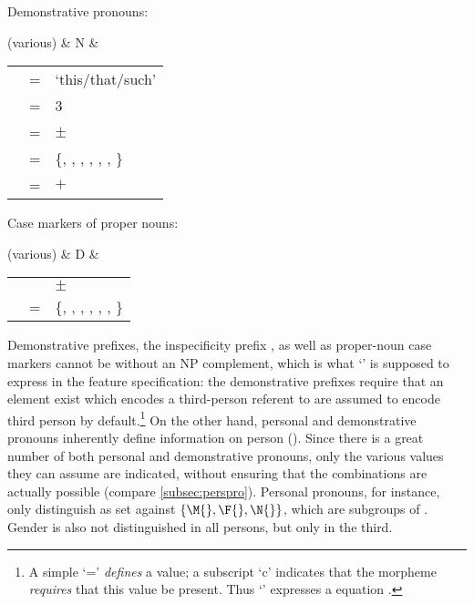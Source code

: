 \a Demonstrative pronouns:\medskip

	\begin{tabu} {}
	(various)
		& N
		& \begin{tabular}[t]{l l l}
			\ups{\Pred} & = & `this/that/such' \\
			\ups{\Pers} & = & 3 \\
			\ups{\Anim} & = & $\pm$ \\
			\ups{\Case} & = & \{\Aarg{}, \Parg{}, \Dat{}, \Gen{}, 
				\Loc{}, \Ins{}, \Caus{}\} \\
			\ups{\Spec} & = & $+$ \\
		\end{tabular}
	\end{tabu}
	
\a\label{ex:dlexsem-propn}Case markers of proper nouns:\medskip	
	
	\begin{tabu} {}
	(various)
		& D
		& \begin{tabular}[t]{l l l}
			\ups{\Anim} & \req{} & $\pm$ \\
			\ups{\Case} & = & \{\Aarg{}, \Parg{}, \Dat{}, \Gen{}, 
				\Loc{}, \Ins{}, \Caus{}\} \\
		\end{tabular}
	\end{tabu}\medskip
	
\xe

Demonstrative prefixes, the inspecificity prefix , as well as 
proper-noun case markers cannot be without an NP complement, which is what 
`\req{}' is supposed to express in the feature specification: the demonstrative 
prefixes require that an element exist which encodes a third-person referent to 
are assumed to encode third person by default.\footnote{A simple `=' 
\emph{defines} a value; a subscript `c' indicates that the morpheme 
\emph{requires} that this value be present. Thus `\req{}' expresses a 
 equation \citep[59--61]{bresnan2016}.} On the other hand, 
personal and demonstrative pronouns inherently define information on person 
(\Pers{}). Since there is a great number of both personal and demonstrative 
pronouns, only the various values they can assume are indicated, without 
ensuring that the combinations are actually possible (compare 
\autoref{subsec:perspro}). Personal pronouns, for instance, only distinguish 
\Inan{} as set against $\{\M{}, \F{}, \N{}\}$, which are subgroups of \An{}. 
Gender is also not distinguished in all persons, but only in the third.

